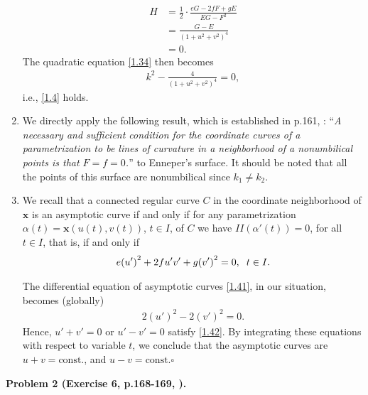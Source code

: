 \documentclass[a4paper]{article}
\numberwithin{equation}{section}
\begin{document}
\begin{enumerate}
\begin{align}
H &= \frac{1}{2} \cdot \frac{{eG - 2fF + gE}}{{EG - {F^2}}}\\
 &= \frac{{G - E}}{{{{\left( {1 + {u^2} + {v^2}} \right)}^4}}}\\
 &= 0.
\end{align}
The quadratic equation \eqref{1.34} then becomes
\begin{align}
{k^2} -  \frac{4}{{{{\left( {1 + {u^2} + {v^2}} \right)}^4}}} = 0,
\end{align}
i.e., \eqref{1.4} holds. 
\item We directly apply the following result, which is established in p.161, \cite{1}: ``\textit{A necessary and sufficient condition for the coordinate curves of a parametrization to be lines of curvature in a neighborhood of a nonumbilical points is that $F=f=0$.}'' to Enneper's surface. It should be noted that all the points of this surface are nonumbilical since $k_1 \ne k_2$.
\item We recall that a connected regular curve $C$ in the coordinate neighborhood of $\mathbf{x}$ is an asymptotic curve if and only if for any parametrization $\alpha \left(t\right)=\mathbf{x}\left(u\left(t\right),v\left(t\right)\right)$, $t\in I$, of $C$ we have $II \left(\alpha '\left(t\right)\right) =0$, for all $t\in I$, that is, if and only if
\begin{align}
\label{1.41}
e{\left( {u'} \right)^2} + 2fu'v' + g{\left( {v'} \right)^2} = 0,\hspace{0.2cm} t \in I.
\end{align}

The differential equation of asymptotic curves \eqref{1.41}, in our situation, becomes (globally)
\begin{align}
\label{1.42}
2{\left( {u'} \right)^2} - 2{\left( {v'} \right)^2} = 0.
\end{align}
Hence, $u' + v' = 0$ or $u' - v' = 0$ satisfy \eqref{1.42}. By integrating these equations with respect to variable $t$, we conclude that the asymptotic curves are $u+v=\mbox{const.}$, and $u-v=\mbox{const}$.\hfill $\square$
\end{enumerate}
\vspace{0.5cm}
\textbf{Problem 2 (Exercise 6, p.168-169, \cite{1}).} 
\end{document}
